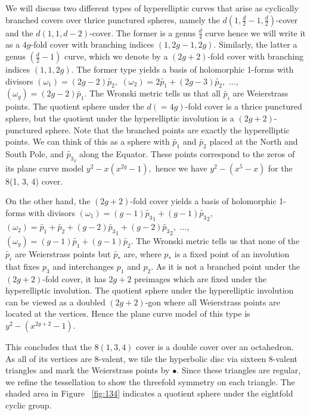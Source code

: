 \documentclass[12pt,reqno]{amsart}
\theoremstyle{definition}
\theoremstyle{remark}
\begin{document}
We will discuss two different types of hyperelliptic curves that arise as cyclically branched covers over thrice punctured spheres, namely the $d (1, \frac{d}{2} - 1, \frac{d}{2})$-cover and the $d (1, 1, d - 2)$-cover. The former is a genus $\frac{d}{4}$ curve hence we will write it as a $4 g$-fold cover with branching indices $(1, 2 g - 1, 2 g).$ Similarly, the latter a genus $\left(\frac{d}{2} - 1\right)$ curve, which we denote by a $(2 g + 2)$-fold cover with branching indices $(1, 1, 2 g).$ The former type yields a basis of holomorphic 1-forms with divisors $(\omega_1) = (2 g - 2) \widetilde{p_2},$ $(\omega_2) = 2 \widetilde{p_1} + (2 g - 3) \widetilde{p_2},$ $\ldots$, $(\omega_g) = (2 g - 2) \widetilde{p_1}.$ The Wronski metric tells us that all $\widetilde{p_i}$ are Weierstrass points. The quotient sphere under the $d (= 4 g)$-fold cover is a thrice punctured sphere, but the quotient under the hyperelliptic involution is a $(2 g + 2)$-punctured sphere. Note that the branched points are exactly the hyperelliptic points. We can think of this as a sphere with $\widetilde{p_1}$ and $\widetilde{p_2}$ placed at the North and South Pole, and $\widetilde{p_3}_i$ along the Equator. These points correspond to the zeros of its plane curve model $y^2 - x (x^{2 g} - 1),$ hence we have $y^2 - (x^5 - x)$ for the 8(1, 3, 4) cover.

On the other hand, the $(2 g + 2)$-fold cover yields a basis of holomorphic 1-forms with divisors $(\omega_1) = (g - 1) \widetilde{p_3}_1 + (g - 1) \widetilde{p_3}_2,$ $(\omega_2) = \widetilde{p_1} + \widetilde{p_2} + (g - 2) \widetilde{p_3}_1 + (g - 2) \widetilde{p_3}_2,$ $\ldots$, $(\omega_g) = (g - 1) \widetilde{p_1} + (g - 1) \widetilde{p_2}.$ The Wronski metric tells us that none of the $\widetilde{p_i}$ are Weierstrass points but $\widetilde{p_*}$ are, where $p_*$ is a fixed point of an involution that fixes $p_3$ and interchanges $p_1$ and $p_2.$ As it is not a branched point under the $(2 g + 2)$-fold cover, it has $2 g + 2$ preimages which are fixed under the hyperelliptic involution. The quotient sphere under the hyperelliptic involution can be viewed as a doubled $(2 g + 2)$-gon where all Weierstrass points are located at the vertices. Hence the plane curve model of this type is $y^2 - (x^{2 g + 2} - 1).$

This concludes that the $8(1, 3, 4)$ cover is a double cover over an octahedron. As all of its vertices are 8-valent, we tile the hyperbolic disc via sixteen 8-valent triangles and mark the Weierstrass points by $\bullet.$ Since these triangles are regular, we refine the tessellation to show the threefold symmetry on each triangle. The shaded area in Figure~ \cref{fig:134} indicates a quotient sphere under the eightfold cyclic group.
\end{document}
